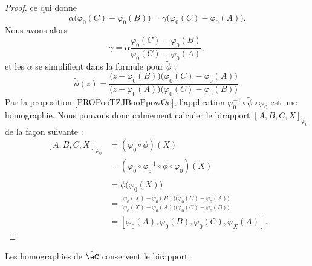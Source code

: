 \begin{proof}
    ce qui donne
    \begin{equation}
        \alpha\big( \varphi_0(C)-\varphi_0(B) \big)=\gamma\big( \varphi_0(C)-\varphi_0(A) \big).
    \end{equation}
    Nous avons alors
    \begin{equation}
        \gamma=\alpha\frac{ \varphi_0(C)-\varphi_0(B) }{ \varphi_0(C)-\varphi_0(A) },
    \end{equation}
    et les \( \alpha\) se simplifient dans la formule pour \( \tilde \phi\) :
    \begin{equation}
        \tilde \phi(z)=\frac{ \big( z- \varphi_0(B)   \big)\big( \varphi_0(C)-\varphi_0(A) \big) }{ \big( z-\varphi_0(A)\big)\big( \varphi_0(C)-\varphi_0(B) \big) }.
    \end{equation}
    Par la proposition \ref{PROPooTZJBooPpowOo}, l'application \( \varphi_0^{-1}\circ\tilde \phi\circ\varphi_0\) est une homographie. Nous pouvons donc calmement calculer le birapport \( [A,B,C,X]_{\varphi_0}\) de la façon suivante :
    \begin{subequations}
        \begin{align}
            [A,B,C,X]_{\varphi_0}&=(\varphi_0\circ\phi)(X)\\
            &=(\varphi_0\circ\varphi_0^{-1}\circ\tilde \phi\circ\varphi_0)(X)\\
            &=\tilde \phi\big( \varphi_0(X) \big)\\
            &=\frac{ \big( \varphi_0(X)-\varphi_0(B) \big)\big( \varphi_0(C)-\varphi_0(A) \big) }{ \big( \varphi_0(X)-\varphi_0(A) \big)\big( \varphi_0(C)-\varphi_0(B) \big) }\\
            &=[\varphi_0(A),\varphi_0(B),\varphi_0(C),\varphi_X(A)].
        \end{align}
    \end{subequations}
\end{proof}

\begin{proposition}     \label{PROPooQGPFooReNaGq}
    Les homographies de \( \hat \eC\) conservent le birapport.
\end{proposition}

